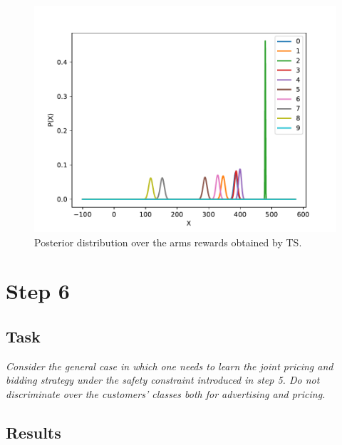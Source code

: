 \documentclass[12pt,a4paper]{report}
\begin{document}
\begin{figure}[H]
\centering
  \includegraphics[scale = 0.7, center]{5arms}
  \caption{Posterior distribution over the arms rewards obtained by TS.}
\end{figure}
		\section{Step 6}
			\subsection{Task}
\textit{Consider the general case in which one needs to learn the joint pricing and bidding strategy under the safety constraint introduced in step 5. Do not discriminate over the customers’ classes both for advertising and pricing.}
			\subsection{Results}
\end{document}
